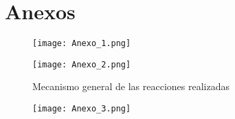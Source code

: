 \documentclass[12pt,letterpaper, onecolumn]{article}
\begin{document}
\section{Anexos}

\begin{figure}[H]
    \centering
    \texttt{[image: Anexo\_1.png]}
    \caption{}
    \label{Fig_1}
\end{figure}


\begin{figure}[H]
    \centering
    \texttt{[image: Anexo\_2.png]}
    \caption{Mecanismo general de las reacciones realizadas}
    \label{Fig_2}
\end{figure}


\begin{figure}[H]
    \centering
    \texttt{[image: Anexo\_3.png]}
    \caption{}
    \label{Fig_3}
\end{figure}


\newpage
\end{document}
